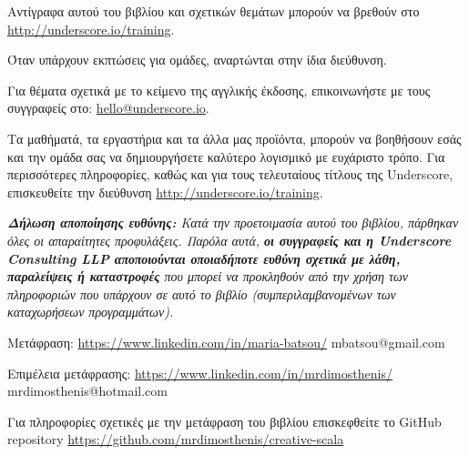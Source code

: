 \begin{center}

Αντίγραφα αυτού του βιβλίου και σχετικών θεμάτων μπορούν να βρεθούν στο \href{http://underscore.io/training}{http://underscore.io/training}.

Όταν υπάρχουν εκπτώσεις για ομάδες, αναρτώνται στην ίδια διεύθυνση.

Για θέματα σχετικά με το κείμενο της αγγλικής έκδοσης, επικοινωνήστε με τους συγγραφείς στο: \href{mailto:hello@underscore.io}{hello@underscore.io}.

\vspace{3em}

Τα μαθήματά, τα εργαστήρια και τα άλλα μας προϊόντα, μπορούν να βοηθήσουν εσάς και την ομάδα σας να δημιουργήσετε καλύτερο λογισμικό με ευχάριστο τρόπο. Για περισσότερες πληροφορίες, καθώς και για τους τελευταίους τίτλους της Underscore, επισκευθείτε την διεύθυνση \href{http://underscore.io/training}{http://underscore.io/training}.

\vspace{3em}

\textit{\textbf{Δήλωση αποποίησης ευθύνης:} Κατά την προετοιμασία αυτού του βιβλίου, πάρθηκαν όλες οι απαραίτητες προφυλάξεις. Παρόλα αυτά, \textbf{οι συγγραφείς και η Underscore Consulting LLP αποποιούνται οποιαδήποτε ευθύνη σχετικά με λάθη, παραλείψεις ή καταστροφές} που μπορεί να προκληθούν από την χρήση των πληροφοριών που υπάρχουν σε αυτό το βιβλίο (συμπεριλαμβανομένων των καταχωρήσεων προγραμμάτων).}

\vspace{3em}

\hline

\vspace{3em}

Μετάφραση: \href{Μαρία Μπάτσου}{https://www.linkedin.com/in/maria-batsou/} mbatsou@gmail.com

\vspace{3em}

Επιμέλεια μετάφρασης: \href{Δημοσθένης Μιχαηλίδης}{https://www.linkedin.com/in/mrdimosthenis/} mrdimosthenis@hotmail.com

\vspace{3em}

Για πληροφορίες σχετικές με την μετάφραση του βιβλίου επισκεφθείτε το GitHub repository \href{mrdimosthenis/creative-scala}{https://github.com/mrdimosthenis/creative-scala}

\end{center}
